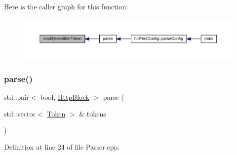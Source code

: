 Here is the caller graph for this function\+:
\nopagebreak
\begin{figure}[H]
\begin{center}
\leavevmode
\includegraphics[width=350pt]{classft_1_1_parser_a8226e5286bd1e9354998fe9e6bb63d08_icgraph}
\end{center}
\end{figure}
\mbox{\label{classft_1_1_parser_ace9c91f641d6eb5467ce89798679b248}} 
\subsubsection{\texorpdfstring{parse()}{parse()}}
{\footnotesize\ttfamily std\+::pair$<$ bool, \hyperlink{classft_1_1_http_block}{Http\+Block} $>$ parse (\begin{DoxyParamCaption}\item[{std\+::vector$<$ \hyperlink{classft_1_1_token}{Token} $>$ \&}]{tokens }\end{DoxyParamCaption})}



Definition at line 24 of file Parser.\+cpp.



